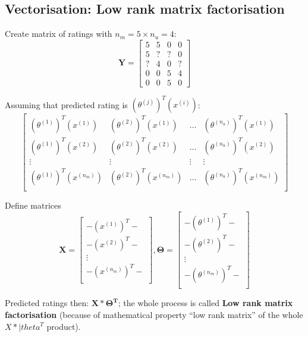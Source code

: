 \documentclass{scrartcl}
\begin{document}
\subsection{Vectorisation: Low rank matrix factorisation}
\label{sec:16-5}

Create matrix of ratings with $n_m = 5 \times n_u=4$:
\[ \mathbf{Y} = \left[
  \begin{array}{cccc}
    5 & 5 & 0 & 0 \\
    5 & ? & ? & 0 \\
    ? & 4 & 0 & ? \\
    0 & 0 & 5 & 4 \\
    0 & 0 & 5 & 0
  \end{array} \right]\]

Assuming that predicted rating is $(\theta^{(j)})^T(x^{(i)})$: \[
\left[
  \begin{array}{cccc}
    (\theta^{(1)})^T(x^{(1)}) &  (\theta^{(2)})^T(x^{(1)}) & \dots &
    (\theta^{(n_u)})^T(x^{(1)}) \\
    (\theta^{(1)})^T(x^{(2)}) &  (\theta^{(2)})^T(x^{(2)}) & \dots &
    (\theta^{(n_u)})^T(x^{(2)}) \\
    \vdots & \vdots & \vdots & \vdots \\
    (\theta^{(1)})^T(x^{(n_m)}) &  (\theta^{(2)})^T(x^{(n_m)}) & \dots &
    (\theta^{(n_u)})^T(x^{(n_m)}) \\
  \end{array}
\right]
\]

Define matrices \[\mathbf{X} = \left[
  \begin{array}{c}
    - (x^{(1)})^T - \\
    - (x^{(2)})^T - \\
    \vdots \\
    - (x^{(n_m)})^T - \\
  \end{array}
\right], \mathbf{\Theta} = \left[
  \begin{array}{c}
    - (\theta^{(1)})^T - \\
    - (\theta^{(2)})^T - \\
    \vdots \\
    - (\theta^{(n_m)})^T - \\
  \end{array}
\right]\]

Predicted ratings then: $\mathbf{X * \Theta^T}$; the whole process is
called {\bf Low rank matrix factorisation} (because of mathematical
property ``low rank matrix'' of the whole $X * |theta^T$ product).
\end{document}
